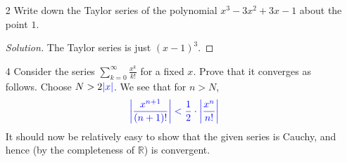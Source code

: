 \documentclass[12pt]{article}
\def\D{\mathrm{d}}
\def\ddfrac#1#2{\displaystyle\frac{\displaystyle #1}{\displaystyle #2}}
\theoremstyle{definition}
\newenvironment{soln}{\begin{proof}[Solution]}{\end{proof}}
\begin{document}
\begin{enumerate}[leftmargin=*]
\begin{soln}
        The remainder term is then just the difference of the arctangent function at $x$ and its Taylor polynomial. More precisely, we have
        \[
            R_n(x) = \arctan(x) - \sum_{k=0}^{M} \frac{(-1)^k}{2k-1} x^{2k-1}
        \]
        with $M$ defined as previously. Let us now calculate the remainder term $R_{2n-1}(x)$ more explicitly. We have
        \[
            \arctan^{\prime} = \textcolor{cyan}{1 - x^2 + x^4 + \ldots + (-1)^{n-1} x^{2n-2}} + (-1)^n x^{2n} \left[1 - x^2 + x^4 - \ldots \right]
        \]
        \[
            \therefore \arctan^{\prime} = \textcolor{cyan}{1 - x^2 + x^4 + (-1)^{n-1} x^{2n-2}} + (-1)^{n} \frac{x^{2n}}{1+x^2}
        \]
        On integrating both sides from $0$ to $x$, the cyan-coloured term just becomes $T_{2n-1}(x)$. (Verify!) Thus, we have
        \[
            \arctan(x) = T_{2n-1}(x) + (-1)^n \int_{0}^{x} \frac{t^{2n}}{1+t^2} \, \D t
        \]
        Thus, 
        \[
            R_{2n-1}(x) = (-1)^n \int_{0}^{x} \frac{t^{2n}}{1+t^2} \, \D t
        \]
        and 
        \[
            R_{2n}(x) = R_{2n-1}(x)
        \]
    \end{soln}
    
    \newpage
    
    \item[2] Write down the Taylor series of the polynomial $x^3 - 3x^2 + 3x - 1$ about the point $1$.
    \begin{soln}
        The Taylor series is just $(x-1)^3$.
    \end{soln}
    
    \item[4] Consider the series $\sum\limits_{k=0}^{\infty} \ddfrac{x^k}{k!}$ for a fixed $x$. Prove that it converges as follows. Choose $N > 2\textcolor{blue}{\abs{x}}$. We see that for $n > N$, 
    \[
        \textcolor{blue}{\abs{\frac{x^{n+1}}{(n+1)!}} < \frac{1}{2} \cdot \abs{\frac{x^n}{n!}}}
    \]
    It should now be relatively easy to show that the given series is Cauchy, and hence (by the completeness of $\mathbb{R}$) is convergent.
    

\end{enumerate}
\end{document}
